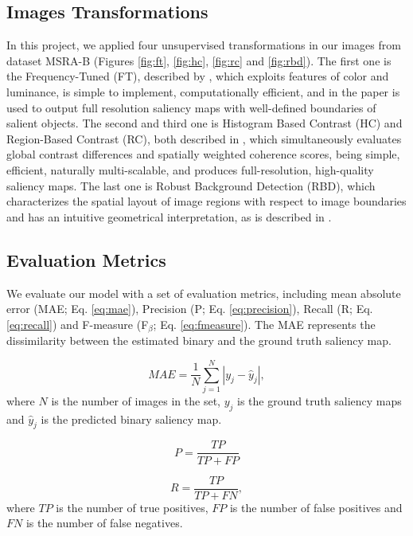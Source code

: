 \documentclass{article}
\begin{document}
\subsection{Images Transformations}

In this project, we applied four unsupervised transformations in our images from dataset MSRA-B (Figures \ref{fig:ft}, \ref{fig:hc}, \ref{fig:rc} and \ref{fig:rbd}). %
The first one is the Frequency-Tuned (FT), described by \cite{FT}, which exploits features of color and luminance, is simple to implement, computationally efficient, and in the paper is used to output full resolution saliency maps with well-defined boundaries of salient objects. 
The second and third one is Histogram Based Contrast (HC) and Region-Based Contrast (RC), both described in \cite{HCRC}, which simultaneously evaluates global contrast differences and spatially weighted coherence scores, being simple, efficient, naturally multi-scalable, and produces full-resolution, high-quality saliency maps. 
The last one is Robust Background Detection (RBD), which characterizes the spatial layout of image regions with respect to image boundaries and has an intuitive geometrical interpretation, as is described in \cite{RBD}.

\subsection{Evaluation Metrics}

We evaluate our model with a set of evaluation metrics, including mean absolute error (MAE; Eq. \eqref{eq:mae}), Precision (P; Eq. \eqref{eq:precision}), Recall (R; Eq. \eqref{eq:recall}) and F-measure (F$_\beta$; Eq. \eqref{eq:fmeasure}). The MAE represents the dissimilarity between the estimated binary and the ground truth saliency map.

\begin{equation}
  MAE = \dfrac{1}{N} \sum_{j=1}^{N} |y_j - \hat{y}_j|,
  \label{eq:mae}
\end{equation}
where $N$ is the number of images in the set, $y_j$ is the ground truth saliency maps and $\hat{y}_j$ is the predicted binary saliency map.

\begin{equation}
 P = \dfrac{TP}{TP + FP}
 \label{eq:precision}
\end{equation}

\begin{equation}
  R = \dfrac{TP}{TP + FN},
  \label{eq:recall}
\end{equation}
where $TP$ is the number of true positives, $FP$ is the number of false positives and $FN$ is the number of false negatives.
\end{document}
